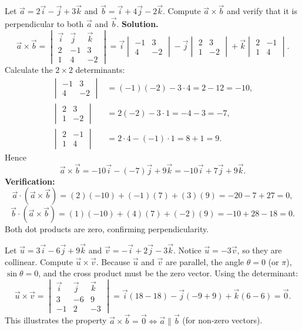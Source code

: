 \documentclass[11pt]{article}
\begin{document}
\begin{exoresolu}
Let $\vec{a}=2\vec{i}-\vec{j}+3\vec{k}$ and $\vec{b}=\vec{i}+4\vec{j}-2\vec{k}$. Compute $\vec{a}\times\vec{b}$ and verify that it is perpendicular to both $\vec{a}$ and $\vec{b}$.
\tcblower
\textbf{Solution.}
\[
\vec{a}\times\vec{b}=
\begin{vmatrix}
\vec{i} & \vec{j} & \vec{k}\\
2 & -1 & 3\\
1 & 4 & -2
\end{vmatrix}
=\vec{i}\begin{vmatrix}-1&3\\4&-2\end{vmatrix}
-\vec{j}\begin{vmatrix}2&3\\1&-2\end{vmatrix}
+\vec{k}\begin{vmatrix}2&-1\\1&4\end{vmatrix}.
\]
Calculate the $2\times2$ determinants:
\begin{align*}
\begin{vmatrix}-1&3\\4&-2\end{vmatrix}&=(-1)(-2)-3\cdot4=2-12=-10,\\
\begin{vmatrix}2&3\\1&-2\end{vmatrix}&=2(-2)-3\cdot1=-4-3=-7,\\
\begin{vmatrix}2&-1\\1&4\end{vmatrix}&=2\cdot4-(-1)\cdot1=8+1=9.
\end{align*}
Hence
\[
\vec{a}\times\vec{b}=-10\vec{i}-(-7)\vec{j}+9\vec{k}=-10\vec{i}+7\vec{j}+9\vec{k}.
\]
\textbf{Verification:}
\[
\vec{a}\cdot(\vec{a}\times\vec{b})=(2)(-10)+(-1)(7)+(3)(9)=-20-7+27=0,
\]
\[
\vec{b}\cdot(\vec{a}\times\vec{b})=(1)(-10)+(4)(7)+(-2)(9)=-10+28-18=0.
\]
Both dot products are zero, confirming perpendicularity.
\end{exoresolu}

\begin{exemplebox}
Let $\vec{u}=3\vec{i}-6\vec{j}+9\vec{k}$ and $\vec{v}=-\vec{i}+2\vec{j}-3\vec{k}$. Notice $\vec{u}=-3\vec{v}$, so they are collinear. Compute $\vec{u}\times\vec{v}$.
\tcblower
Because $\vec{u}$ and $\vec{v}$ are parallel, the angle $\theta=0$ (or $\pi$), $\sin\theta=0$, and the cross product must be the zero vector. Using the determinant:
\[
\vec{u}\times\vec{v}=
\begin{vmatrix}
\vec{i} & \vec{j} & \vec{k}\\
3 & -6 & 9\\
-1 & 2 & -3
\end{vmatrix}
=\vec{i}(18-18)-\vec{j}(-9+9)+\vec{k}(6-6)=\vec{0}.
\]
This illustrates the property $\vec{a}\times\vec{b}=\vec{0}\iff\vec{a}\parallel\vec{b}$ (for non‑zero vectors).
\end{exemplebox}
\end{document}

